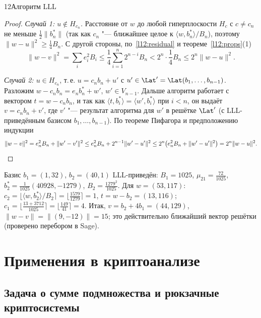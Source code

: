 \begin{lecture}{12}{Алгоритм LLL}
\begin{proof}
\emph{Случай 1: $u \notin H_{c_n}$.} Расстояние от $w$ до любой гиперплоскости $H_c$
с $c \ne c_n$ не меньше $\frac12 \|b_n^*\|$ (так как $c_n$ "--- ближайшее целое к
$\langle w, b_n^*\rangle / B_n$), поэтому $\|w - u\|^2 \ge \frac14 B_n$. С другой стороны,
по~\eqref{l12:residual} и теореме~\ref{l12:props}(1)
\[
  \|w - v\|^2 = \sum_{i} e_i^2 B_i \le \frac14 \sum_{i=1}^n 2^{n-i} B_n < 2^n \cdot \frac14 B_n
  \le 2^n \|w - u\|^2 .
\]

\emph{Случай 2: $u \in H_{c_n}$}, т.\,е. $u = c_n b_n + u'$ с $u' \in \Lat' =
\Lat(b_1, \dots, b_{n-1})$. Разложим $w - c_n b_n = e_n b_n^* + w'$, $w' \in V_{n-1}$. Дальше
алгоритм работает с вектором $t = w - c_n b_n$, и так как $\langle t, b_i^* \rangle =
\langle w', b_i^*\rangle$ при $i < n$, он выдаёт $v = c_n b_n + v'$, где $v'$ "--- результат
алгоритма для $w'$ в решётке $\Lat'$ (с LLL-приведённым базисом $b_1, \dots, b_{n-1}$). По
теореме Пифагора и предположению индукции
\[
  \|w - v\|^2 = e_n^2 B_n + \|w' - v'\|^2 \le e_n^2 B_n + 2^{n-1} \|w' - u'\|^2
  \le 2^n \bigl(e_n^2 B_n + \|w' - u'\|^2\bigr) = 2^n \|w - u\|^2 . \qedhere
\]
\end{proof}

\begin{example}
Базис $b_1 = (1, 32)$, $b_2 = (40, 1)$ LLL-приведён: $B_1 = 1025$, $\mu_{21} = \frac{72}{1025}$,
$b_2^* = \frac{1}{1025}(40928, -1279)$, $B_2 = \frac{1279^2}{1025}$. Для $w = (53, 117)$:
$c_2 = \lfloor \langle w, b_2^*\rangle / B_2 \rceil = \lfloor \frac{1579}{1279} \rceil = 1$,
$t = w - b_2 = (13, 116)$; $c_1 = \lfloor \frac{13 + 3712}{1025} \rceil = \lfloor
\frac{149}{41} \rceil = 4$. Итак, $v = b_2 + 4 b_1 = (44, 129)$, $\|w - v\| = \|(9, -12)\| =
15$; это действительно ближайший вектор решётки (проверено перебором в Sage).
\end{example}


\section{Применения в криптоанализе}

\subsection{Задача о сумме подмножества и рюкзачные криптосистемы}


\end{lecture}
